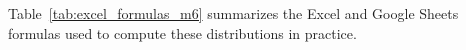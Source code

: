 
Table~\ref{tab:excel_formulas_m6} summarizes the Excel and Google Sheets formulas used to compute these distributions in practice.


